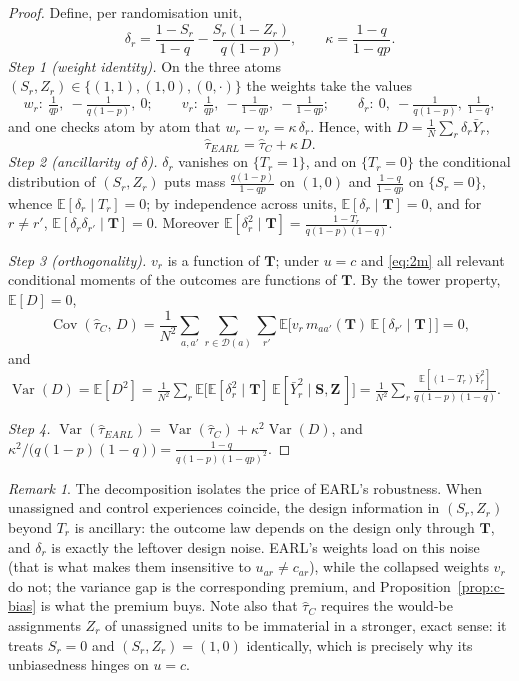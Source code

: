 \documentclass[11pt]{article}
\theoremstyle{remark}
\newtheorem{remark}{Remark}
\newcommand{\E}{\mathbb{E}}
\newcommand{\var}{\operatorname{Var}}
\newcommand{\cov}{\operatorname{Cov}}
\begin{document}
\begin{proof}
Define, per randomisation unit,
\[
\delta_r = \frac{1-S_r}{1-q} - \frac{S_r(1-Z_r)}{q(1-p)},
\qquad
\kappa = \frac{1-q}{1-qp}.
\]
\emph{Step 1 (weight identity).} On the three atoms $(S_r,Z_r) \in \{(1,1),(1,0),(0,\cdot)\}$ the weights take the values
\[
w_r:\ \tfrac{1}{qp},\ -\tfrac{1}{q(1-p)},\ 0;
\qquad
v_r:\ \tfrac{1}{qp},\ -\tfrac{1}{1-qp},\ -\tfrac{1}{1-qp};
\qquad
\delta_r:\ 0,\ -\tfrac{1}{q(1-p)},\ \tfrac{1}{1-q},
\]
and one checks atom by atom that $w_r - v_r = \kappa\,\delta_r$. Hence, with $D = \frac1N\sum_{r}\delta_r \bar Y_r$,
\[
\hat\tau_{EARL} = \hat\tau_{C} + \kappa\, D .
\]
\emph{Step 2 (ancillarity of $\delta$).} $\delta_r$ vanishes on $\{T_r=1\}$, and on $\{T_r=0\}$ the conditional distribution of $(S_r,Z_r)$ puts mass $\tfrac{q(1-p)}{1-qp}$ on $(1,0)$ and $\tfrac{1-q}{1-qp}$ on $\{S_r=0\}$, whence $\E[\delta_r\mid T_r] = 0$; by independence across units, $\E[\delta_r \mid \mathbf T] = 0$, and for $r \neq r'$, $\E[\delta_r\delta_{r'}\mid \mathbf T] = 0$. Moreover
$\E[\delta_r^2 \mid \mathbf T] = \tfrac{1-T_r}{q(1-p)(1-q)}$.

\emph{Step 3 (orthogonality).} $v_r$ is a function of $\mathbf T$; under $u=c$ and \eqref{eq:2m} all relevant conditional moments of the outcomes are functions of $\mathbf T$. By the tower property, $\E[D] = 0$,
\[
\cov(\hat\tau_C,\, D) = \frac{1}{N^2}\sum_{a,a'}\sum_{r\in\mathcal D(a)}\sum_{r'} \E\big[v_r\, m_{aa'}(\mathbf T)\, \E[\delta_{r'}\mid\mathbf T]\big] = 0,
\]
and $\var(D) = \E[D^2] = \frac{1}{N^2}\sum_r \E\big[\E[\delta_r^2\mid\mathbf T]\, \E[\bar Y_r^2\mid \mathbf S,\mathbf Z\,]\big] = \frac{1}{N^2}\sum_r \frac{\E[(1-T_r)\bar Y_r^2]}{q(1-p)(1-q)}$.

\emph{Step 4.} $\var(\hat\tau_{EARL}) = \var(\hat\tau_C) + \kappa^2\var(D)$, and $\kappa^2 / \big(q(1-p)(1-q)\big) = \tfrac{1-q}{q(1-p)(1-qp)^2}$.
\end{proof}

\begin{remark}
The decomposition isolates the price of EARL's robustness. When unassigned and control experiences coincide, the design information in $(S_r, Z_r)$ beyond $T_r$ is ancillary: the outcome law depends on the design only through $\mathbf T$, and $\delta_r$ is exactly the leftover design noise. EARL's weights load on this noise (that is what makes them insensitive to $u_{ar} \neq c_{ar}$), while the collapsed weights $v_r$ do not; the variance gap is the corresponding premium, and Proposition~\ref{prop:c-bias} is what the premium buys. Note also that $\hat\tau_C$ requires the would-be assignments $Z_r$ of unassigned units to be immaterial in a stronger, exact sense: it treats $S_r = 0$ and $(S_r,Z_r)=(1,0)$ identically, which is precisely why its unbiasedness hinges on $u = c$.
\end{remark}
\end{document}
